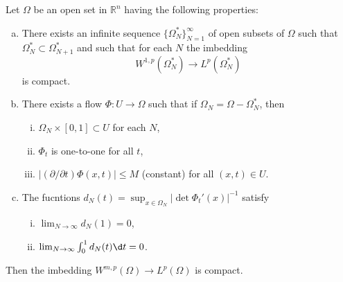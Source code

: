 \begin{theorem}
  Let $\Omega$ be an open set in $\mathbb{R}^n$ having the following properties:
  \begin{enumerate}[(a)]
    \item There exists an infinite sequence $\{\Omega_N^*\}_{N=1}^\infty$ of open subsets
      of $\Omega$ such that $\Omega_N^*\subset\Omega_{N+1}^*$ and such that for each
      $N$ the imbedding
      \[ W^{1,p}(\Omega_N^*) \to L^p(\Omega_N^*) \]
      is compact.
    \item There exists a flow $\Phi: U\to\Omega$ such that if $\Omega_N = \Omega - \Omega_N^*$,
      then
      \begin{enumerate}[(i)]
        \item $\Omega_N \times [0,1] \subset U$ for each $N$,
        \item $\Phi_t$ is one-to-one for all $t$,
        \item $|(\partial/\partial t) \Phi(x,t)| \leq M$ (constant) for all $(x,t)\in U$.
      \end{enumerate}
    \item The fucntions $d_N(t) = \sup_{x\in\Omega_N} |\det\Phi_t'(x)|^{-1}$ satisfy
      \begin{enumerate}[(i)]
        \item $\lim_{N\to\infty} d_N(1) = 0$,
        \item $\lim_{N\to\infty} \int_0^1 d_N(t) \d t = 0$.
      \end{enumerate}
  \end{enumerate}
  Then the imbedding $W^{m,p}(\Omega)\to L^p(\Omega)$ is compact.
\end{theorem}

